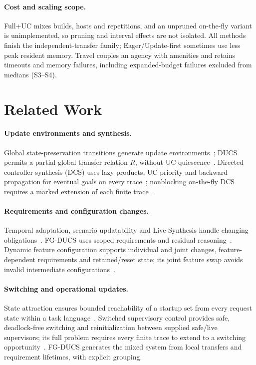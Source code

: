 \documentclass[acmsmall,screen,review,anonymous]{acmart}
\begin{document}


\paragraph{Cost and scaling scope.}\label{sec:rq4}
Full+UC mixes builds, hosts and repetitions, and an unpruned on-the-fly variant is unimplemented, so pruning and interval effects are not isolated. All methods finish the independent-transfer family; Eager/Update-first sometimes use less peak resident memory. Travel couples an agency with amenities and retains timeouts and memory failures, including expanded-budget failures excluded from medians (S3--S4).


\section{Related Work}
\label{sec:related}
\label{sec:expressiveness}
\paragraph{Update environments and synthesis.}
Global state-preservation transitions generate update environments~\cite[Sec.~V]{Yamauchi2020Partitioning}; DUCS permits a partial global transfer relation $R$, without UC quiescence~\cite[Sec.~4.2, Defs.~3.7, 5.1]{Nahabedian2020}. Directed controller synthesis (DCS) uses lazy products, UC priority and backward propagation for eventual goals on every trace~\cite[Sec.~IV]{CiolekDCS}; nonblocking on-the-fly DCS requires a marked extension of each finite trace~\cite[Def.~4]{CiolekEtAl2023OTFDCS}.

\paragraph{Requirements and configuration changes.}
Temporal adaptation, scenario updatability and Live Synthesis handle changing obligations~\cite{ZhangCheng2006ALTL,Ghezzi2012DynamicScenarioUpdate,PanzicaLaManna2013CorrectnessDynamicUpdates,FinkbeinerEtAl2022LiveSynthesis}. FG-DUCS uses scoped requirements and residual reasoning~\cite{Dwyer1999Patterns,RosuHavelund2005Rewriting}. Dynamic feature configuration supports individual and joint changes, feature-dependent requirements and retained/reset state; its joint feature swap avoids invalid intermediate configurations~\cite[Secs.~4--7]{ThuijsmanReniers2024DynamicFeature}.

\paragraph{Switching and operational updates.}
State attraction ensures bounded reachability of a startup set from every request state within a task language~\cite[Def.~2, Alg.~1, Thm.~1]{NooruldeenSchmidt2015}. Switched supervisory control provides safe, deadlock-free switching and reinitialization between supplied safe/live supervisors; its full problem requires every finite trace to extend to a switching opportunity~\cite[Problem~1, Sec.~3.3]{MeiraGoesLafortune2020Switching}. FG-DUCS generates the mixed system from local transfers and requirement lifetimes, with explicit grouping.
\end{document}
